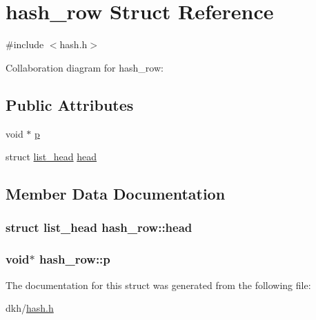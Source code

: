 \hypertarget{structhash__row}{\section{hash\+\_\+row Struct Reference}
\label{structhash__row}
}


{\ttfamily \#include $<$hash.\+h$>$}



Collaboration diagram for hash\+\_\+row\+:
\subsection*{Public Attributes}
\begin{DoxyCompactItemize}
\item 
void $\ast$ \hyperlink{structhash__row_a270cca5040fb8c27a8b5595cc921d960}{p}
\item 
struct \hyperlink{structlist__head}{list\+\_\+head} \hyperlink{structhash__row_aeef0a2f42e9fa516efe336bba7a990d4}{head}
\end{DoxyCompactItemize}


\subsection{Member Data Documentation}
\hypertarget{structhash__row_aeef0a2f42e9fa516efe336bba7a990d4}{
\subsubsection[{head}]{\setlength{\rightskip}{0pt plus 5cm}struct {\bf list\+\_\+head} hash\+\_\+row\+::head}}\label{structhash__row_aeef0a2f42e9fa516efe336bba7a990d4}
\hypertarget{structhash__row_a270cca5040fb8c27a8b5595cc921d960}{
\subsubsection[{p}]{\setlength{\rightskip}{0pt plus 5cm}void$\ast$ hash\+\_\+row\+::p}}\label{structhash__row_a270cca5040fb8c27a8b5595cc921d960}


The documentation for this struct was generated from the following file\+:\begin{DoxyCompactItemize}
\item 
dkh/\hyperlink{hash_8h}{hash.\+h}\end{DoxyCompactItemize}
